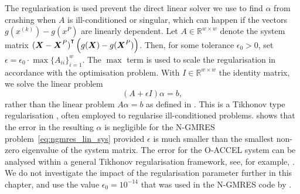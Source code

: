 \documentclass[main.tex]{subfiles}
\begin{document}
The regularisation is used prevent the direct linear solver we use to
find $\alpha$ from crashing when $A$ is ill-conditioned or singular,
which can happen if the vectors $g(x^{(k)})-g(x^P)$ are linearly
dependent.  Let $A\in\mathbb R^{w\times w}$ denote the system matrix
${(\boldsymbol{X}-\boldsymbol{X}^P)}^\intercal\left(
  g(\boldsymbol{X})-g(\boldsymbol{X}^P) \right)$.  Then, for some
tolerance $\epsilon_0>0$, set
$\epsilon=\epsilon_0\cdot\max{\{A_{ii}\}}_{i=1}^w$. The $\max$ term is
used to scale the regularisation in accordance with the optimisation
problem.  With $I\in\mathbb{R}^{w\times w}$ the identity matrix, we
solve the linear problem
\begin{equation}
  (A+\epsilon I)\alpha = b,
\end{equation}
rather than the linear problem $A\alpha=b$ as defined in
.  This is a Tikhonov type
regularisation \citep{neumaier1998solving}, often employed to
regularise ill-conditioned problems.  \citet{washio1997krylov} shows
that the error in the resulting $\alpha$ is negligible for the N-GMRES
problem~\eqref{eq:ngmres_lin_sys} provided $\epsilon$ is much smaller
than the smallest non-zero eigenvalue of the system matrix.  The error
for the O-ACCEL system can be analysed within a general Tikhonov
regularisation framework, see, for example,
\citet{neumaier1998solving}. We do not investigate the impact of the
regularisation parameter further in this chapter, and use the value
$\epsilon_0=10^{-14}$ that was used in the N-GMRES code by
\citet{sterck2013steepest}.
\end{document}
